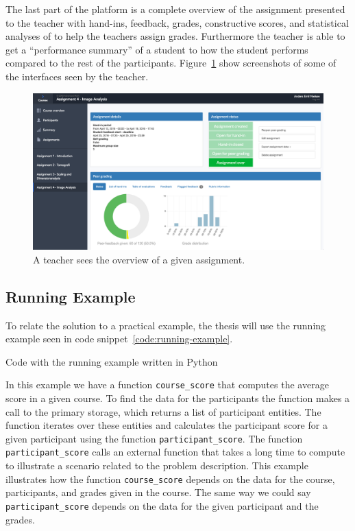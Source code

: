 The last part of the platform is a complete overview of the assignment presented to the teacher with hand-ins, feedback, grades, constructive scores, and statistical analyses of to help the teachers assign grades. Furthermore the teacher is able to get a ``performance summary'' of a student to how the student performs compared to the rest of the participants. Figure~\ref{fig:teacher-screenshot} show screenshots of some of the interfaces seen by the teacher.

\begin{figure}[ht!]
  \centering
  \includegraphics[width=1.0\linewidth]{figures/screenshots/teacher_assignment_overview.png}
  \caption[Screenshot from Peergrade.io]{A teacher sees the overview of a given assignment.}
  \label{fig:teacher-screenshot}
\end{figure}


\subsection{Running Example}
\label{subsec:running-example}

To relate the solution to a practical example, the thesis will use the running example seen in code snippet~\ref{code:running-example}.

\begin{code}{Code with the running example written in Python}
	
	\label{code:running-example}
\end{code}

In this example we have a function \verb$course_score$ that computes the average score in a given course. To find the data for the participants the function makes a call to the primary storage, which returns a list of participant entities. The function iterates over these entities and calculates the participant score for a given participant using the function \verb$participant_score$. The function \verb$participant_score$ calls an external function that takes a long time to compute to illustrate a scenario related to the problem description. This example illustrates how the function \verb$course_score$ depends on the data for the course, participants, and grades given in the course. The same way we could say \verb$participant_score$ depends on the data for the given participant and the grades.

